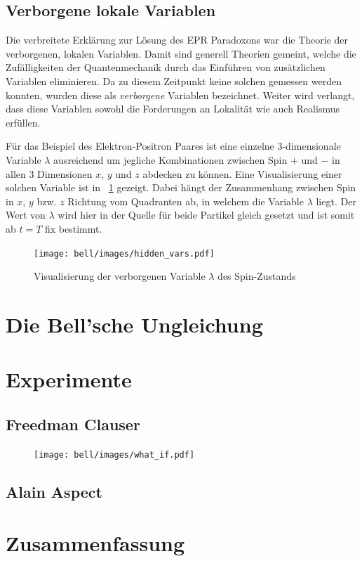 \begin{refsection}

\subsection{Verborgene lokale Variablen}
Die verbreitete Erkl\"arung zur L\"osung des EPR Paradoxons war die Theorie
der verborgenen, lokalen Variablen. Damit sind generell Theorien gemeint,
welche die Zuf\"alligkeiten der Quantenmechanik durch das Einf\"uhren von
zus\"atzlichen Variablen eliminieren. Da zu diesem Zeitpunkt keine solchen
gemessen werden konnten, wurden diese als \emph{verborgene}
Variablen bezeichnet. Weiter wird verlangt, dass diese Variablen sowohl
die Forderungen an Lokalit\"at wie auch Realismus erf\"ullen.

F\"ur das Beispiel des Elektron-Positron Paares ist eine 
einzelne 3-dimensionale Variable $\lambda$ ausreichend um jegliche
Kombinationen zwischen Spin $+$ und $-$ in allen 3 Dimensionen 
$x$, $y$ und $z$ abdecken zu k\"onnen.
Eine Visualisierung einer solchen Variable ist in
\figurename~\ref{fig:Bell:hidden_var} gezeigt. Dabei h\"angt der Zusammenhang
zwischen Spin in $x$, $y$ bzw. $z$ Richtung vom Quadranten ab, in welchem
die Variable $\lambda$ liegt. Der Wert von $\lambda$ wird hier in der Quelle
f\"ur beide Partikel gleich gesetzt und ist somit ab $t=T$ fix bestimmt.

\begin{figure}
    \centering
    \texttt{[image: bell/images/hidden\_vars.pdf]}
    \caption{Visualisierung der verborgenen Variable $\lambda$ des Spin-Zustands}
    \label{fig:Bell:hidden_var}
\end{figure}


\section{Die Bell'sche Ungleichung}


\section{Experimente}
\subsection{Freedman Clauser}
    
    \begin{figure}[ht!]
        \centering
        \texttt{[image: bell/images/what\_if.pdf]}
    \end{figure}
    
\subsection{Alain Aspect}

\section{Zusammenfassung}


\printbibliography[heading=subbibliography]
\end{refsection}

